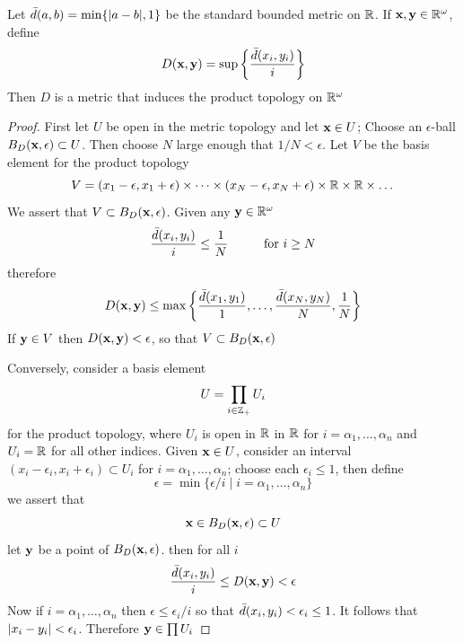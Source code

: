 \documentclass[11pt]{article}
\begin{document}
\begin{theorem}[]
Let \(\bard(a,b)=\min\{\abs{a-b},1\}\) be the standard bounded metric on \(\mathbb{R}\). If \(\operatorname{\textbf{x}},\operatorname{\textbf{y}}\in\mathbb{R}^\omega\),
define
\begin{equation*}
D(\operatorname{\textbf{x}},\operatorname{\textbf{y}})=\sup\left\{
\frac{\bar{d}(x_i,y_i)}{i}
\right\}
\end{equation*}
Then \(D\) is a metric that induces the product topology on \(\mathbb{R}^\omega\)
\end{theorem}

\begin{proof}
First let \(U\) be open in the metric topology and let \(\operatorname{\textbf{x}}\in U\); Choose an
\(\epsilon\)-ball \(B_D(\operatorname{\textbf{x}},\epsilon)\subset U\). Then choose \(N\) large enough that \(1/N<\epsilon\). Let \(V\) be the basis
element for the product topology
\begin{equation*}
V=(x_1-\epsilon,x_1+\epsilon)\times\dots\times(x_N-\epsilon,x_N+\epsilon)\times\mathbb{R}\times\mathbb{R}\times\dots
\end{equation*}
We assert that \(V\subset B_D(\operatorname{\textbf{x}},\epsilon)\). Given any \(\operatorname{\textbf{y}}\in\mathbb{R}^\omega\)
\begin{equation*}
\frac{\bar{d}(x_i,y_i)}{i}\le\frac{1}{N}\hspace{1cm}\text{for }i\ge N
\end{equation*}
therefore
\begin{equation*}
D(\operatorname{\textbf{x}},\operatorname{\textbf{y}})\le\max\left\{\frac{\bar{d}(x_1,y_1)}{1},\dots,\frac{\bar{d}(x_N,y_N)}{N},\frac{1}{N}\right\}
\end{equation*}
If \(\operatorname{\textbf{y}}\in V\) then \(D(\operatorname{\textbf{x}},\operatorname{\textbf{y}})<\epsilon\), so that \(V\subset B_D(\operatorname{\textbf{x}},\epsilon)\)

Conversely, consider a basis element
\begin{equation*}
U=\prod_{i\in\mathbb{Z}_+}U_i
\end{equation*}
for the product topology, where \(U_i\) is open in \(\mathbb{R}\) in \(\mathbb{R}\) for \(i= \alpha_1,\dots,\alpha_n\) and \(U_i=\mathbb{R}\)
for all other indices. Given \(\operatorname{\textbf{x}}\in U\), consider an interval \((x_i-\epsilon_i,x_i+\epsilon_i)\subset U_i\)
for \(i= \alpha_1,\dots,\alpha_n\); choose each \(\epsilon_i\le 1\), then define
\begin{equation*}
\epsilon=\min\{\epsilon/i\mid i= \alpha_1,\dots,\alpha_n\}
\end{equation*}
we assert that
\begin{equation*}
\operatorname{\textbf{x}}\in B_D(\operatorname{\textbf{x}},\epsilon)\subset U
\end{equation*}
let \(\operatorname{\textbf{y}}\) be a point of \(B_D(\operatorname{\textbf{x}},\epsilon)\). then for all \(i\)
\begin{equation*}
\frac{\bar{d}(x_i,y_i)}{i}\le D(\operatorname{\textbf{x}},\operatorname{\textbf{y}})<\epsilon
\end{equation*}
Now if \(i= \alpha_1,\dots,\alpha_n\) then \(\epsilon\le\epsilon_i/i\) so that \(\bar{d}(x_i,y_i)<\epsilon_i\le 1\). It follows
that \(\abs{x_i-y_i}<\epsilon_i\). Therefore \(\operatorname{\textbf{y}}\in\prod U_i\)
\end{proof}
\end{document}

